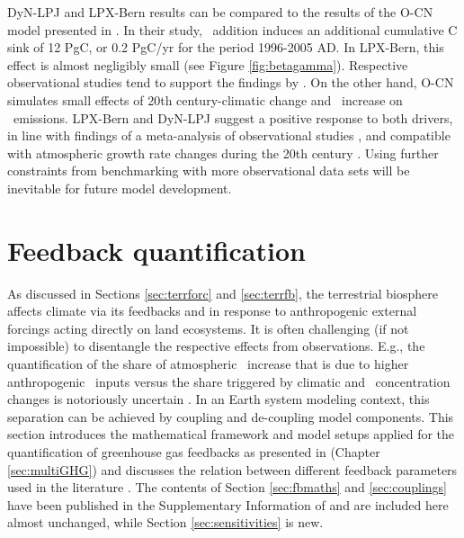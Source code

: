 DyN-LPJ and LPX-Bern results can be compared to the results of the O-CN model presented in \citet{zaehle11ngeo}. 
In their study, \nr\ addition induces an additional cumulative C sink of 12 PgC, or 0.2 PgC/yr for the period 1996-2005 AD. In LPX-Bern, this effect is almost negligibly small (see Figure \ref{fig:betagamma}). Respective observational studies tend to support the findings by \citet{zaehle11ngeo}. On the other hand, O-CN simulates small effects of 20th century-climatic change and \coo\ increase on \nno\ emissions. LPX-Bern and DyN-LPJ suggest a positive response to both drivers, in line with findings of a meta-analysis of observational studies \citep{vangroenigen11}, and compatible with atmospheric growth rate changes during the 20th century \citep{xuri12nphyt}. Using further constraints from benchmarking with more observational data sets will be inevitable for future model development.\\


\clearpage

\section{Feedback quantification}
\label{sec:concepts}
As discussed in Sections \ref{sec:terrforc} and \ref{sec:terrfb}, the terrestrial biosphere affects climate via its feedbacks and in response to anthropogenic external forcings acting directly on land ecosystems. It is often challenging (if not impossible) to disentangle the respective effects from observations. E.g., the quantification of the share of atmospheric \nno\ increase that is due to higher anthropogenic \nr\ inputs versus the share triggered by climatic and \coo\ concentration changes is notoriously uncertain \citep{xuri12nphyt, zaehle11ngeo}. In an Earth system modeling context, this separation can be achieved by coupling and de-coupling model components. This section introduces the mathematical framework and model setups applied for the quantification of greenhouse gas feedbacks as presented in \citet{stocker13natcc} (Chapter \ref{sec:multiGHG}) and discusses the relation between different feedback parameters used in the literature \citep{friedlingstein06, gregory09jclim, arora13}. The contents of Section \ref{sec:fbmaths} and \ref{sec:couplings} have been published in the Supplementary Information of \citet{stocker13natcc} and are included here almost unchanged, while Section \ref{sec:sensitivities} is new.

